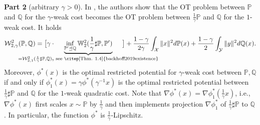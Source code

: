 \documentclass{article} %
\begin{document}
\textbf{Part 2} (arbitrary $\gamma>0$). In \citep[]{gozlan2020mixture}, the authors show that the OT problem between $\mathbb{P}$ and $\mathbb{Q}$ for the $\gamma$-weak cost becomes the OT problem between $\frac{1}{\gamma} \mathbb{P}$ and $\mathbb{Q}$ for the $1$-weak cost. It holds
\begin{equation}\mathcal{W}_{2,\gamma}^{2}(\mathbb{P},\mathbb{Q})=\big[\gamma\cdot\hspace{-20mm}\underbrace{\inf_{\mathbb{P}'\preceq \mathbb{Q}}\mathbb{W}_{2}^{2}(\frac{1}{\gamma} \sharp\mathbb{P},\mathbb{P}')}_{=\mathcal{W}_{2,1}^{2}(\frac{1}{\gamma} \sharp\mathbb{P},\mathbb{Q})\mbox{,\scriptsize\hspace{1mm}see \citep[Thm. 1.4]{backhoff2019existence}}}\hspace{-20mm}\big]+\frac{1-\gamma}{2\gamma}\int_{\mathcal{X}}\|x\|^{2}d\mathbb{P}(x)+\frac{1-\gamma}{2}\int_{\mathcal{Y}}\|y\|^{2}d\mathbb{Q}(x).
\label{w2-through-projection}
\end{equation}
Moreover, $\phi^{*}(x)$ is the optimal restricted potential for $\gamma$-weak cost between $\mathbb{P},\mathbb{Q}$ if and only if $\phi^{*}_{1}(x)=\gamma\phi^{*}(\gamma ^{-1}x)$ is the optimal restricted potential between $\frac{1}{\gamma} \sharp\mathbb{P}$ and $\mathbb{Q}$ for the $1$-weak quadratic cost. Note that $\nabla\phi^{*}(x)=\nabla\phi^{*}_{1}(\frac{1}{\gamma} x)$, i.e., $\nabla\phi^{*}(x)$ first scales $x\sim\mathbb{P}$ by $\frac{1}{\gamma} $ and then implements projection $\nabla\phi_{1}^{*}$ of $\frac{1}{\gamma} \sharp\mathbb{P}$ to $\mathbb{Q}$. In particular, the function $\phi^{*}$ is $\frac{1}{\gamma}$-Lipschitz.
\end{document}

